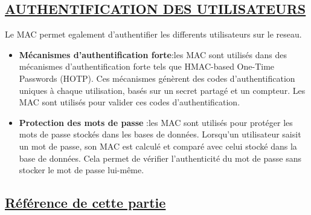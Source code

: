 \subsection{\textbf{\underline{AUTHENTIFICATION DES UTILISATEURS}}}

Le MAC permet egalement d'authentifier les differents utilisateurs sur le reseau.

\begin{itemize}[label=$\cdot$]
        \item \textbf{Mécanismes d'authentification forte}:les MAC sont utilisés dans des mécanismes d'authentification forte tels que HMAC-based One-Time Passwords (HOTP). Ces mécanismes génèrent des codes d'authentification uniques à chaque utilisation, basés sur un secret partagé et un compteur. Les MAC sont utilisés pour valider ces codes d'authentification.
        \item \textbf{Protection des mots de passe} :les MAC sont utilisés pour protéger les mots de passe stockés dans les bases de données. Lorsqu'un utilisateur saisit un mot de passe, son MAC est calculé et comparé avec celui stocké dans la base de données. Cela permet de vérifier l'authenticité du mot de passe sans stocker le mot de passe lui-même.

\end{itemize}
\newpage

\subsection{\textbf{\underline{Référence de cette partie}}}
\begin{center}
    \cite{cini2021updatable}\\
    \cite{athmani2010protocole}\\
    \cite{dierks2008transport}\\
    \cite{mckusick2015design}\\
    \cite{krawczyk2010cryptographic}\\
    \cite{turner2008keyed}\\
    \cite{vazquez2021pakemail}\\
\end{center}